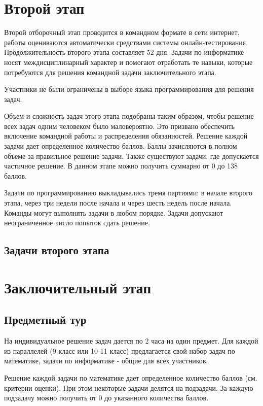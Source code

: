 \documentclass[a4paper,12pt,oneside]{book}
\begin{document}
\part{Второй этап}
\newpage

Второй отборочный этап проводится в командном формате в сети
интернет, работы оцениваются автоматически средствами системы
онлайн-тестирования.
Продолжительность второго этапа составляет 52 дня. Задачи
по информатике носят междисциплинарный характер и помогают отработать те
навыки, которые потребуются для решения командной задачи заключительного этапа.

Участники не были ограничены в выборе языка программирования для
решения задач.

Объем и сложность задач этого этапа подобраны таким образом,
чтобы решение всех задач одним человеком было маловероятно. Это
призвано обеспечить включение командной работы и распределения
обязанностей. Решение каждой задачи дает определенное количество
баллов. Баллы зачисляются в полном объеме за
правильное решение задачи.
Также существуют задачи, где допускается частичное решение.
В данном этапе можно получить суммарно от
0 до 138 баллов.

Задачи по программированию выкладывались
тремя партиями: в начале второго этапа, через три недели после начала
и через шесть недель после начала.
Команды могут выполнять задачи в любом порядке. Задачи допускают
неограниченное число попыток сдать решение.

\chapter{Задачи второго этапа}



\part{Заключительный этап}

\clearpage
\chapter{Предметный тур}

На индивидуальное решение задач дается по 2 часа на один предмет.
Для каждой из параллелей (9 класс или 10-11 класс) предлагается свой
набор задач по математике, задачи по информатике - общие для всех
участников.

Решение каждой задачи по математике дает определенное количество
баллов (см. критерии оценки). При этом некоторые задачи делятся на
подзадачи. За каждую подзадачу можно получить от 0 до указанного
количества баллов.
\end{document}
